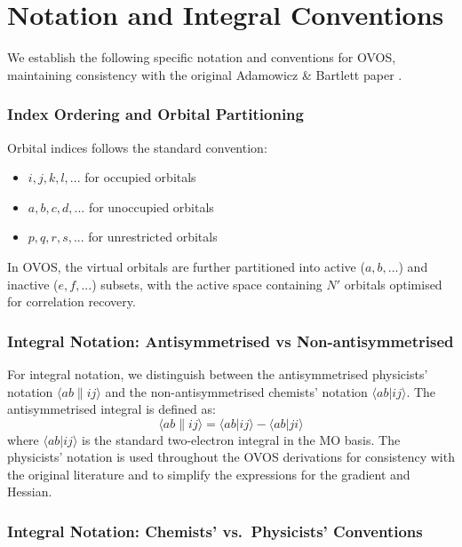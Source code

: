 \section{Notation and Integral Conventions}
\label{sec:int_notation}

We establish the following specific notation and conventions for OVOS, maintaining consistency with the original Adamowicz \& Bartlett paper \cite{Adamowicz1987}.


\subsubsection{Index Ordering and Orbital Partitioning}


Orbital indices follows the standard convention:
\begin{itemize}
    \item $i,j,k,l,...$ for occupied orbitals
    \item $a,b,c,d,...$ for unoccupied orbitals
    \item $p,q,r,s,...$ for unrestricted orbitals
\end{itemize}

In OVOS, the virtual orbitals are further partitioned into active ($a,b,...$) and inactive ($e,f,...$) subsets, with the active space containing $N'$ orbitals optimised for correlation recovery.


\subsubsection{Integral Notation: Antisymmetrised vs Non-antisymmetrised}

For integral notation, we distinguish between the antisymmetrised physicists' notation $\langle ab\|ij\rangle$ and the non-antisymmetrised chemists' notation $\langle ab|ij\rangle$. 
The antisymmetrised integral is defined as:
\begin{equation*}
\langle ab\|ij\rangle = \langle ab|ij\rangle - \langle ab|ji\rangle
\end{equation*}
where $\langle ab|ij\rangle$ is the standard two-electron integral in the MO basis. 
The physicists' notation is used throughout the OVOS derivations for consistency with the original literature and to simplify the expressions for the gradient and Hessian.


\subsubsection{Integral Notation: Chemists' vs.\ Physicists' Conventions}

